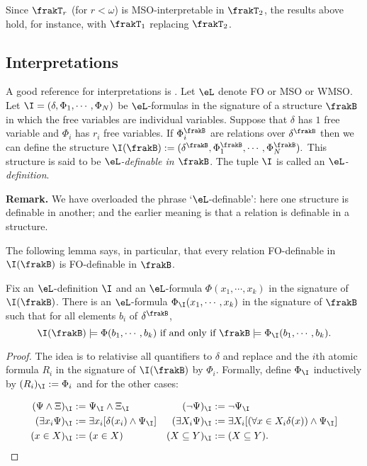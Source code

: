 \begin{remark}
Since $\frakT_r$ (for $r < \omega$) is MSO-interpretable in $\frakT_2$, the results above hold, for instance, with $\frakT_1$ replacing $\frakT_2$.
\end{remark}

\subsection{Interpretations}

A good reference for interpretations is \cite{Hodg93}.
Let $\eL$ denote FO or MSO or WMSO. Let  $\I = (\delta, \Phi_1, \cdots, \Phi_N)$ be $\eL$-formulas in the signature of a structure $\frakB$ in 
which the free variables are individual variables.
Suppose that $\delta$ has $1$ free variable and $\Phi_i$ has $r_i$ free variables.
If $\Phi_i^\frakB$ are relations over $\delta^\frakB$ then we can define the structure 
$\I(\frakB) := (\delta^\frakB, \Phi_1^\frakB, \cdots, \Phi_N^\frakB).$ 
This structure is said to be {\em $\eL$-definable in $\frakB$}. The tuple $\I$ is called an {\em $\eL$-definition}.

{\bf Remark.} We have overloaded the phrase `$\eL$-definable': here one structure is definable in another; 
and the earlier meaning is that a relation is definable in a structure.

The following lemma says, in particular, that every relation FO-definable in $\I(\frakB)$ is 
FO-definable in $\frakB$.

\begin{lemma} \label{AS:lem:translation} 
Fix an $\eL$-definition $\I$ and an $\eL$-formula $\Phi(x_1,\cdots,x_k)$ in the signature of $\I(\frakB)$.
There is an $\eL$-formula $\Phi_\I(x_1,\cdots,x_k)$ in the signature of $\frakB$ such that for all elements $b_i$ of $\delta^\frakB$,
\[
\I(\frakB) \models \Phi(b_1,\cdots,b_k) \mbox{ if and only if } \frakB \models \Phi_\I(b_1,\cdots,b_k).
\]
\end{lemma}

\begin{proof}
The idea is to relativise all quantifiers to $\delta$ and replace and the $i$th atomic formula $R_i$ in the signature of $\I(\frakB)$ 
by $\Phi_i$.
Formally, define $\Phi_\I$ inductively by $(R_i)_\I := \Phi_i$ and for the other cases:

\begin{align*}
(\Psi \wedge \Xi)_\I & := \Psi_\I \wedge \Xi_\I  					&(\neg \Psi)_\I & := \neg \Psi_\I \\
(\exists x_i \Psi)_\I & := \exists x_i [\delta(x_i) \wedge \Psi_\I]  		&(\exists X_i \Psi)_\I & := \exists X_i [(\forall x \in X_i \delta(x)) \wedge \Psi_\I]\\
(x \in X)_\I &:= (x \in X)  & (X \subseteq Y)_\I &:= (X \subseteq Y) .
\end{align*}
\end{proof}

